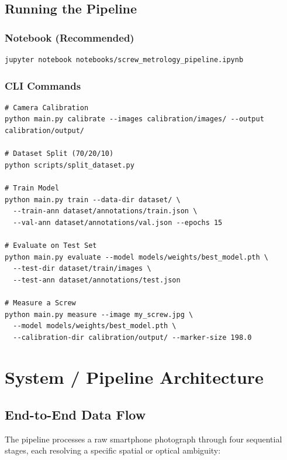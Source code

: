 \documentclass[12pt, a4paper, twoside]{report}
\begin{document}
\section{Running the Pipeline}

\subsection{Notebook (Recommended)}
\begin{lstlisting}[style=bashstyle]
jupyter notebook notebooks/screw_metrology_pipeline.ipynb
\end{lstlisting}

\subsection{CLI Commands}
\begin{lstlisting}[style=bashstyle]
# Camera Calibration
python main.py calibrate --images calibration/images/ --output calibration/output/

# Dataset Split (70/20/10)
python scripts/split_dataset.py

# Train Model
python main.py train --data-dir dataset/ \
  --train-ann dataset/annotations/train.json \
  --val-ann dataset/annotations/val.json --epochs 15

# Evaluate on Test Set
python main.py evaluate --model models/weights/best_model.pth \
  --test-dir dataset/train/images \
  --test-ann dataset/annotations/test.json

# Measure a Screw
python main.py measure --image my_screw.jpg \
  --model models/weights/best_model.pth \
  --calibration-dir calibration/output/ --marker-size 198.0
\end{lstlisting}


\chapter{System / Pipeline Architecture}
\label{ch:architecture}

\section{End-to-End Data Flow}
The pipeline processes a raw smartphone photograph through four sequential stages, each resolving a specific spatial or optical ambiguity:
\end{document}
